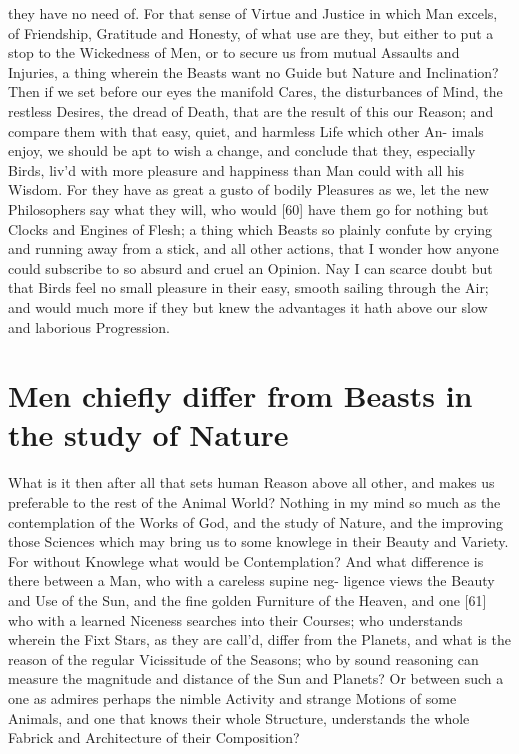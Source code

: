 \documentclass[letterpaper]{book}
\begin{document}
they have no need of. For that sense of Virtue and Justice in which Man
excels, of Friendship, Gratitude and Honesty, of what use are they, but
either to put a stop to the Wickedness of Men, or to secure us from mutual
Assaults and Injuries, a thing wherein the Beasts want no Guide but Nature
and Inclination? Then if we set before our eyes the manifold Cares, the
disturbances of Mind, the restless Desires, the dread of Death, that are the
result of this our Reason; and compare them with that easy, quiet, and
harmless Life which other An- imals enjoy, we should be apt to wish a
change, and conclude that they, especially Birds, liv'd with more pleasure
and happiness than Man could with all his Wisdom. For they have as great a
gusto of bodily Pleasures as we, let the new Philosophers say what they
will, who would [60] have them go for nothing but Clocks and Engines of
Flesh; a thing which Beasts so plainly confute by crying and running away
from a stick, and all other actions, that I wonder how anyone could
subscribe to so absurd and cruel an Opinion. Nay I can scarce doubt but that
Birds feel no small pleasure in their easy, smooth sailing through the Air;
and would much more if they but knew the advantages it hath above our slow
and laborious Progression.



\section{Men chiefly differ from Beasts in the study of Nature}

What is it then after all that sets human Reason above all other, and makes
us preferable to the rest of the Animal World? Nothing in my mind so much
as the contemplation of the Works of God, and the study of Nature, and
the improving those Sciences which may bring us to some knowlege in their
Beauty and Variety. For without Knowlege what would be Contemplation?
And what difference is there between a Man, who with a careless supine neg-
ligence views the Beauty and Use of the Sun, and the fine golden Furniture
of the Heaven, and one [61] who with a learned Niceness searches into their
Courses; who understands wherein the Fixt Stars, as they are call'd, differ
from the Planets, and what is the reason of the regular Vicissitude of the
Seasons; who by sound reasoning can measure the magnitude and distance
of the Sun and Planets? Or between such a one as admires perhaps the
nimble Activity and strange Motions of some Animals, and one that knows
their whole Structure, understands the whole Fabrick and Architecture of
their Composition?
\end{document}

